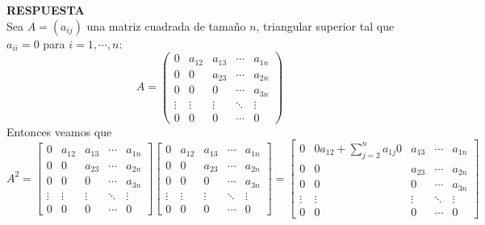 \documentclass[11pt,letterpaper]{article}
\newcommand{\res}{\textbf{RESPUESTA}\\}
\begin{document}
\begin{enumerate}
\res
Sea $A=(a_{ij})$ una matriz cuadrada de tamaño $n$, triangular superior tal que $a_{ii}=0$ para $i=1, \cdots , n$:
\begin{equation*}
A=\left( \begin{array}{ccccc}
0& a_{12} & a_{13} & \cdots & a_{1n}\\
0 & 0 & a_{23} & \cdots & a_{2n}\\
0 & 0 & 0 & \cdots & a_{3n}\\
\vdots & \vdots & \vdots & \ddots & \vdots\\
0 & 0 & 0 & \cdots & 0
\end{array}\right)
\end{equation*}
Entonces veamos que 
\begin{equation*}
A^2=\left[ \begin{array}{ccccc}
0& a_{12} & a_{13} & \cdots & a_{1n}\\
0 & 0 & a_{23} & \cdots & a_{2n}\\
0 & 0 & 0 & \cdots & a_{3n}\\
\vdots & \vdots & \vdots & \ddots & \vdots\\
0 & 0 & 0 & \cdots & 0
\end{array}\right]
\left[ \begin{array}{ccccc}
0& a_{12} & a_{13} & \cdots & a_{1n}\\
0 & 0 & a_{23} & \cdots & a_{2n}\\
0 & 0 & 0 & \cdots & a_{3n}\\
\vdots & \vdots & \vdots & \ddots & \vdots\\
0 & 0 & 0 & \cdots & 0
\end{array}\right]= 
\left[ \begin{array}{ccccc}
0 & 0a_{12}+\sum_{j=2}^na_{1j}0 & a_{13} & \cdots & a_{1n}\\
0 & 0 & a_{23} & \cdots & a_{2n}\\
0 & 0 & 0 & \cdots & a_{3n}\\
\vdots & \vdots & \vdots & \ddots & \vdots\\
0 & 0 & 0 & \cdots & 0
\end{array}\right]
\end{equation*}

\end{enumerate}
\end{document}
